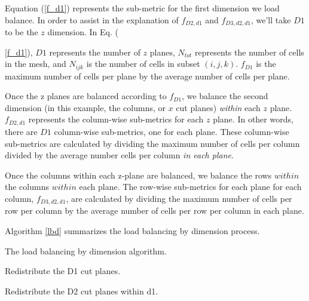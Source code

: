 \documentclass[letterpaper]{mandc2019}
\begin{document}
Equation (\ref{f_d1}) represents the sub-metric for the first dimension we load balance. In order to assist in the explanation of $f_{D2,d1}$ and $f_{D3,d2,d1}$, we'll take $D1$ to be the $z$ dimension. In Eq. ({\ref{f_d1}), $D1$ represents the number of $z$ planes, $N_{tot}$ represents the number of cells in the mesh, and $N_{ijk}$ is the number of cells in subset $(i,j,k)$. $f_{D1}$ is the maximum number of cells per plane by the average number of cells per plane. 

Once the z planes are balanced according to $f_{D1}$, we balance the second dimension (in this example, the columns, or $x$ cut planes) \textit{within} each $z$ plane. $f_{D2,d1}$ represents the column-wise sub-metrics for each $z$ plane. In other words, there are $D1$ column-wise sub-metrics, one for each plane. These column-wise sub-metrics are calculated by dividing the maximum number of cells per column divided by the average number cells per column \textit{in each plane}. 

Once the columns within each z-plane are balanced, we balance the rows $within$ the columns $within$ each plane. The row-wise sub-metrics for each plane for each column, $f_{D3,d2,d1}$, are calculated by dividing the maximum number of cells per row per column by the average number of cells per row per column in each plane.

Algorithm \ref{lbd} summarizes the load balancing by dimension process.

\begin{algorithm}[htb]
\caption{The load balancing by dimension algorithm.}
\label{lbd}
\begin{algorithmic}

    \STATE Redistribute the D1 cut planes.
  \ENDIF  
  
      \STATE Redistribute the D2 cut planes within d1. 
    \ENDIF
  \ENDFOR
  
\ENDWHILE
\end{algorithmic}
\end{algorithm}

}
\end{document}
